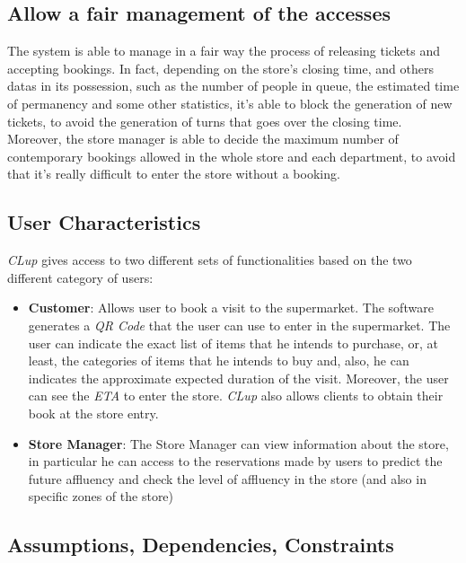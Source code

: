 \documentclass{article}
\begin{document}
		\subsection{Allow a fair management of the accesses}
		The system is able to manage in a fair way the process of releasing tickets and accepting bookings. In fact, depending on the store's closing time, and others datas in its possession, such as the number of people in queue, the estimated time of permanency and some other statistics, it's able to block the generation of new tickets, to avoid the generation of turns that goes over the closing time. Moreover, the store manager is able to decide the maximum number of contemporary bookings allowed in the whole store and each department, to avoid that it's really difficult to enter the store without a booking.

	
	\subsection{User Characteristics}
	
	\emph{CLup} gives access to two different sets of functionalities based on the two different category of users:
	
	\begin{itemize}
		
		\item {\bfseries Customer}: Allows user to book a visit to the supermarket. The software generates a \emph{QR Code} that the user can use to enter in the supermarket. The user can indicate the exact list of items that he intends to purchase, or, at least, the categories of items that he intends to buy and, also, he can indicates the approximate expected duration of the visit. Moreover, the user can see the \emph{ETA} to enter the store. \emph{CLup} also allows clients to obtain their book at the store entry.\\
		
		\item {\bfseries Store Manager}: The Store Manager can view information about the store, in particular he can access to the reservations made by users to predict the future affluency and check the level of affluency in the store (and also in specific zones of the store) \\
		
	\end{itemize}

	\subsection{Assumptions, Dependencies, Constraints}
	
\end{document}
